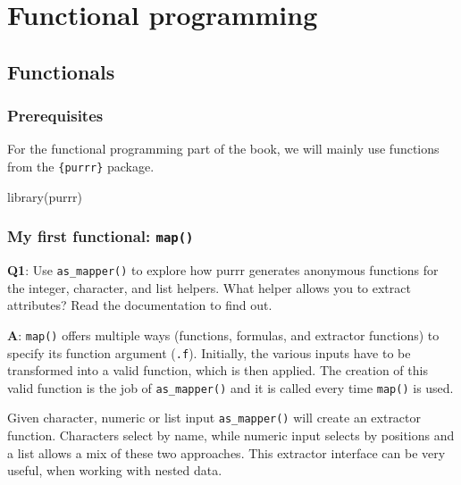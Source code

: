 \documentclass[
]{krantz}
\makeatletter
\newenvironment{Shaded}{\begin{snugshade}}{\end{snugshade}}
\newcommand{\KeywordTok}[1]{\textcolor[rgb]{0.13,0.29,0.53}{\textbf{#1}}}
\newcommand{\NormalTok}[1]{#1}
\newenvironment{kframe}{%
\medskip{}
\setlength{\fboxsep}{.8em}
 \def\at@end@of@kframe{}%
 \ifinner\ifhmode%
  \def\at@end@of@kframe{\end{minipage}}%
  \begin{minipage}{\columnwidth}%
 \fi\fi%
 \def\FrameCommand##1{\hskip\@totalleftmargin \hskip-\fboxsep
 \colorbox{shadecolor}{##1}\hskip-\fboxsep
     \hskip-\linewidth \hskip-\@totalleftmargin \hskip\columnwidth}%
 \MakeFramed {\advance\hsize-\width
   \@totalleftmargin\z@ \linewidth\hsize
   \@setminipage}}%
 {\par\unskip\endMakeFramed%
 \at@end@of@kframe}
\renewenvironment{Shaded}{\begin{kframe}}{\end{kframe}}
\renewcommand{\KeywordTok} [1]{\textcolor[rgb]{0.00,0.44,0.13}{{#1}}}
\renewcommand{\NormalTok}  [1]{{#1}}
\makeatother
\begin{document}
\hypertarget{part-functional-programming}{%
\part{Functional programming}\label{part-functional-programming}}

\hypertarget{functionals}{%
\chapter{Functionals}\label{functionals}}

\hypertarget{prerequisites-3}{%
\section*{Prerequisites}\label{prerequisites-3}}


For the functional programming part of the book, we will mainly use functions from the \texttt{\{purrr\}} package.

\begin{Shaded}
\begin{Highlighting}[]
\KeywordTok{library}\NormalTok{(purrr)}
\end{Highlighting}
\end{Shaded}


\hypertarget{my-first-functional-map}{%
\section{\texorpdfstring{My first functional: \texttt{map()}}{My first functional: map()}}\label{my-first-functional-map}}

\textbf{{Q1}}: Use \texttt{as\_mapper()} to explore how purrr generates anonymous functions for the integer, character, and list helpers. What helper allows you to extract attributes? Read the documentation to find out.

\textbf{{A}}: \texttt{map()} offers multiple ways (functions, formulas, and extractor functions) to specify its function argument (\texttt{.f}). Initially, the various inputs have to be transformed into a valid function, which is then applied. The creation of this valid function is the job of \texttt{as\_mapper()} and it is called every time \texttt{map()} is used.

Given character, numeric or list input \texttt{as\_mapper()} will create an extractor function. Characters select by name, while numeric input selects by positions and a list allows a mix of these two approaches. This extractor interface can be very useful, when working with nested data.
\end{document}

